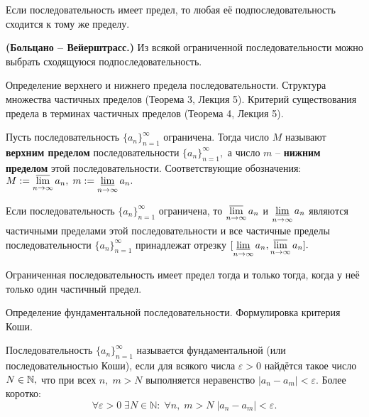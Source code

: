 \begin{lemma}
	Если последовательность имеет предел,
	то любая её подпоследовательность сходится
	к тому же пределу.
\end{lemma}

\begin{theorem}\textbf{(Больцано -- Вейерштрасс.)}
	Из всякой ограниченной последовательности
	можно выбрать сходящуюся подпоследовательность.
\end{theorem}


\newpage
\begin{problem}
Определение верхнего и нижнего предела последовательности. Структура множества
частичных пределов (Теорема 3, Лекция 5). Критерий существования предела в терминах
частичных пределов (Теорема 4, Лекция 5).
\end{problem}

\begin{definition}
	Пусть последовательность
	$\{a_n\}_{n=1}^{\infty}$ ограничена.
	Тогда число $M$ называют \textbf{верхним
		пределом} последовательности
	$\{a_n\}_{n=1}^{\infty},$ а число
	$m$ -- \textbf{нижним пределом}
	этой последовательности.
	Соответствующие обозначения:
	$
		M:=\operatorname*{\overline{lim}}\limits_{n\rightarrow\infty}a_n,\;
		m:=\operatorname*{\underline{lim}}\limits_{n\rightarrow\infty}a_n.
	$
\end{definition}
\begin{theorem}
	Если последовательность $\{a_n\}_{n=1}^{\infty}$
	ограничена, то $\operatorname*{\overline{lim}}\limits_{n\rightarrow\infty}a_n$
	и $\operatorname*{\underline{lim}}\limits_{n\rightarrow\infty}a_n$ являются
	частичными пределами этой последовательности
	и все частичные пределы
	последовательности $\{a_n\}_{n=1}^{\infty}$
	принадлежат отрезку
	$[\operatorname*{\underline{lim}}\limits_{n\rightarrow\infty}a_n,
				\operatorname*{\overline{lim}}\limits_{n\rightarrow\infty}a_n].$
\end{theorem}


\begin{theorem}
	Ограниченная последовательность имеет предел
	тогда и только тогда, когда у неё только
	один частичный предел.
\end{theorem}

\newpage
\begin{problem}
Определение фундаментальной последовательности. Формулировка критерия Коши.
\end{problem}
\begin{definition}
	Последовательность
	$\{a_n\}_{n=1}^{\infty}$
	называется фундаментальной
	(или последовательностью Коши),
	если для всякого числа $\varepsilon>0$
	найдётся такое число
	$N\in\mathbb{N},$ что при всех
	$n,\;m>N$ выполняется неравенство
	$|a_n-a_m|<\varepsilon.$
	Более коротко:
	$$
		\forall\varepsilon>0\;\exists
		N\in\mathbb{N}:\;\forall
		n,\;m>N\;
		|a_n-a_m|<\varepsilon.
	$$
\end{definition}

